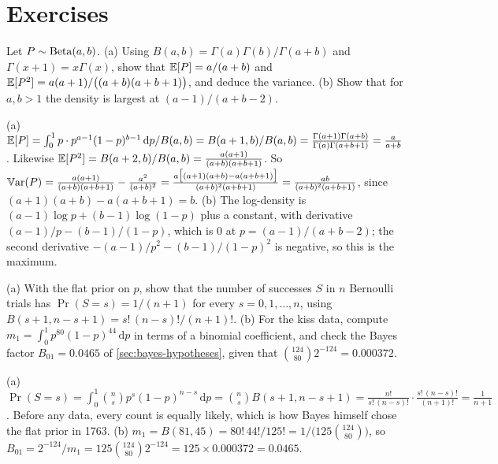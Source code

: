 \section{Exercises}
\label{sec:bayes-exercises}

\begin{exercise}
\label{ex:bayes-beta-moments}
Let $P \sim \mathrm{Beta}(a, b)$. (a) Using $B(a, b) = \Gamma(a)\Gamma(b)/\Gamma(a + b)$ and $\Gamma(x + 1) = x\Gamma(x)$, show that $\operatorname*{\mathbb{E}}[P] = a/(a + b)$ and $\operatorname*{\mathbb{E}}[P^2] = a(a + 1)/\big((a + b)(a + b + 1)\big)$, and deduce the variance. (b) Show that for $a, b > 1$ the density is largest at $(a - 1)/(a + b - 2)$.
\end{exercise}
\begin{solution}
(a) $\operatorname*{\mathbb{E}}[P] = \int_0^1 p \cdot p^{a-1}(1 - p)^{b-1}\,\mathrm{d}p/B(a, b) = B(a + 1, b)/B(a, b) = \frac{\Gamma(a + 1)\Gamma(a + b)}{\Gamma(a)\Gamma(a + b + 1)} = \frac{a}{a + b}$. Likewise $\operatorname*{\mathbb{E}}[P^2] = B(a + 2, b)/B(a, b) = \frac{a(a + 1)}{(a + b)(a + b + 1)}$. So $\operatorname*{\mathbb{V}\text{ar}}(P) = \frac{a(a + 1)}{(a + b)(a + b + 1)} - \frac{a^2}{(a + b)^2} = \frac{a\big[(a + 1)(a + b) - a(a + b + 1)\big]}{(a + b)^2(a + b + 1)} = \frac{ab}{(a + b)^2(a + b + 1)}$, since $(a + 1)(a + b) - a(a + b + 1) = b$. (b) The log-density is $(a - 1)\log p + (b - 1)\log(1 - p)$ plus a constant, with derivative $(a - 1)/p - (b - 1)/(1 - p)$, which is $0$ at $p = (a - 1)/(a + b - 2)$; the second derivative $-(a - 1)/p^2 - (b - 1)/(1 - p)^2$ is negative, so this is the maximum.
\end{solution}

\begin{exercise}
\label{ex:bayes-flat-marginal}
(a) With the flat prior on $p$, show that the number of successes $S$ in $n$ Bernoulli trials has $\Pr(S = s) = 1/(n + 1)$ for every $s = 0, 1, \ldots, n$, using $B(s + 1, n - s + 1) = s!\,(n - s)!/(n + 1)!$. (b) For the kiss data, compute $m_1 = \int_0^1 p^{80}(1 - p)^{44}\,\mathrm{d}p$ in terms of a binomial coefficient, and check the Bayes factor $B_{01} = 0.0465$ of \cref{sec:bayes-hypotheses}, given that $\binom{124}{80}2^{-124} = 0.000372$.
\end{exercise}
\begin{solution}
(a) $\Pr(S = s) = \int_0^1 \binom{n}{s}p^s(1 - p)^{n-s}\,\mathrm{d}p = \binom{n}{s}B(s + 1, n - s + 1) = \frac{n!}{s!\,(n - s)!}\cdot\frac{s!\,(n - s)!}{(n + 1)!} = \frac{1}{n + 1}$. Before any data, every count is equally likely, which is how Bayes himself chose the flat prior in 1763. (b) $m_1 = B(81, 45) = 80!\,44!/125! = 1/\big(125\binom{124}{80}\big)$, so $B_{01} = 2^{-124}/m_1 = 125\binom{124}{80}2^{-124} = 125 \times 0.000372 = 0.0465$.
\end{solution}

